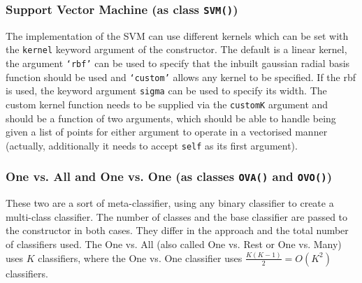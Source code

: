 \documentclass[a4paper, 12pt]{article}
\begin{document}
\subsubsection{Support Vector Machine (as class \texttt{SVM()})}
The implementation of the SVM can use different kernels which can be set with the \texttt{kernel} keyword argument of the constructor. The default is a linear kernel, the argument \texttt{`rbf'} can be used to specify that the inbuilt gaussian radial basis function should be used and \texttt{`custom'} allows any kernel to be specified. If the rbf is used, the keyword argument \texttt{sigma} can be used to specify its width. The custom kernel function needs to be supplied via the \texttt{customK} argument and should be a function of two arguments, which should be able to handle being given a list of points for either argument to operate in a vectorised manner (actually, additionally it needs to accept \texttt{self} as its first argument).

\subsubsection{One vs. All and One vs. One (as classes \texttt{OVA()} and \texttt{OVO()})}
These two are a sort of meta-classifier, using any binary classifier to create a multi-class classifier. The number of classes and the base classifier are passed to the constructor in both cases. They differ in the approach and the total number of classifiers used. The One vs. All (also called One vs. Rest or One vs. Many) uses $K$ classifiers, where the One vs. One classifier uses $\frac{K(K-1)}{2} = O(K^2)$ classifiers.
\end{document}
